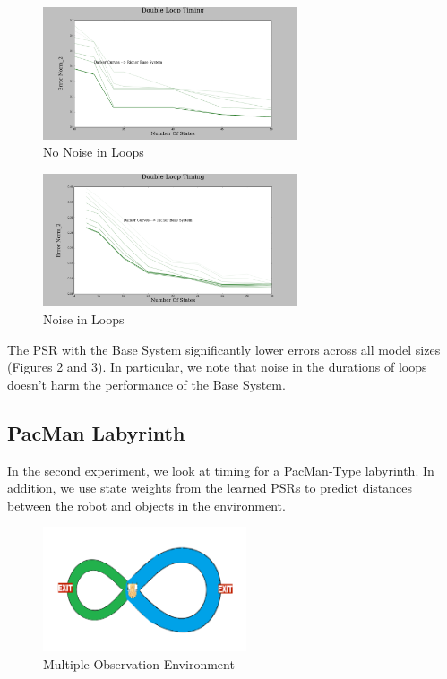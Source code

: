 \documentclass{acm_proc_article-sp}
\begin{document}
\begin{figure}[ht!]
\centering
\includegraphics[width=75mm]{lucasplots/monImages/DoubleLoopTiming0.png}
\caption{No Noise in Loops \label{overflow}}
\end{figure}

\begin{figure}[ht!]
\centering
\includegraphics[width=75mm]{lucasplots/monImages/DoubleLoopTiming0_1.png}
\caption{Noise in Loops \label{overflow}}
\end{figure}

The PSR with the Base System significantly lower errors across all model sizes (Figures 2 and 3). In particular, we note that noise in the durations of loops doesn't harm the performance of the Base System.

\subsection{PacMan Labyrinth}

In the second experiment, we look at timing for a PacMan-Type labyrinth. In addition, we use state weights from the learned PSRs to predict distances between the robot and objects in the environment. 

\begin{figure}[ht!]
\centering
\includegraphics[width=60mm]{lucasplots/monImages/doubleLoopImageMO.png}
\caption{Multiple Observation Environment \label{overflow}}
\end{figure}
\end{document}
